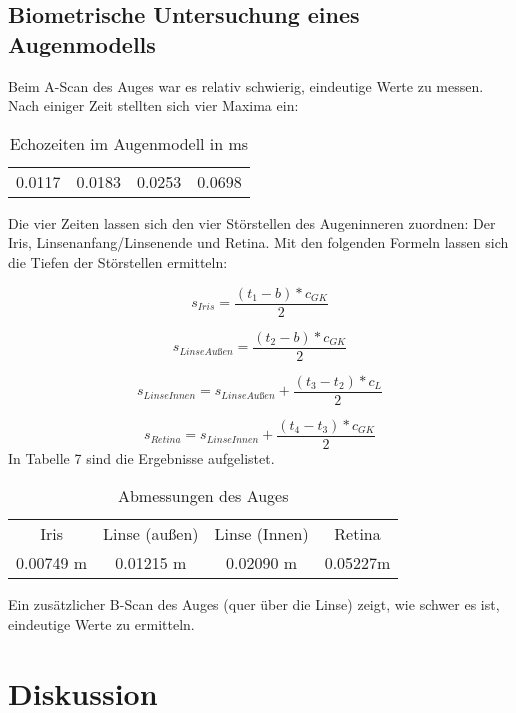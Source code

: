 \documentclass[11pt,ngerman,a4paper]{article}
\begin{document}
\subsection{Biometrische Untersuchung eines Augenmodells}
Beim A-Scan des Auges war es relativ schwierig, eindeutige Werte zu messen. Nach einiger Zeit stellten sich vier Maxima ein:
\begin{table}[h]
\centering
 \begin{tabular}{|c|c|c|c|}
 0.0117 & 0.0183 & 0.0253 & 0.0698 \\
 \end{tabular}
\caption{Echozeiten im Augenmodell in ms}
\end{table}
\newline
Die vier Zeiten lassen sich den vier Störstellen des Augeninneren zuordnen: Der Iris, Linsenanfang/Linsenende und Retina. 
Mit den folgenden Formeln lassen sich die Tiefen der Störstellen ermitteln:

\begin{equation}
s_{Iris}=\frac{(t_1-b)*c_{GK}}{2}
\end{equation}

\begin{equation}
s_{LinseAußen}=\frac{(t_2-b)*c_{GK}}{2}
\end{equation}

\begin{equation}
s_{LinseInnen}=s_{LinseAußen}+\frac{(t_3-t_2)*c_L}{2}
\end{equation}

\begin{equation}
s_{Retina}=s_{LinseInnen}+\frac{(t_4-t_3)*c_{GK}}{2}
\end{equation}
\newline
In Tabelle 7 sind die Ergebnisse aufgelistet.
\begin{table}[h]
\centering
 \begin{tabular}{|c|c|c|c|}
 Iris & Linse (außen) & Linse (Innen) & Retina \\
0.00749 m & 0.01215 m & 0.02090 m & 0.05227m \\
 \end{tabular}
\label{7}
\caption{Abmessungen des Auges}
\end{table}
\newline
Ein zusätzlicher B-Scan des Auges (quer über die Linse) zeigt, wie schwer es ist, eindeutige Werte zu ermitteln.

\section{Diskussion}
\end{document}
